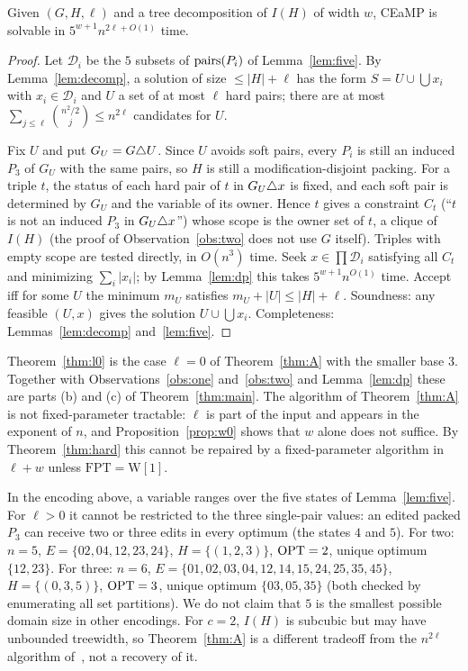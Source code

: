 \begin{theorem}\label{thm:A}
Given $(G,H,\ell)$ and a tree decomposition of $I(H)$ of width $w$, CEaMP is solvable in $5^{w+1}n^{2\ell+O(1)}$ time.
\end{theorem}
\begin{proof}
Let $\mathcal D_i$ be the $5$ subsets of $\mathrm{pairs}(P_i)$ of Lemma~\ref{lem:five}. By Lemma~\ref{lem:decomp}, a solution of size $\le|H|+\ell$ has the form $S=U\cup\bigcup x_i$ with $x_i\in\mathcal D_i$ and $U$ a set of at most $\ell$ hard pairs; there are at most $\sum_{j\le\ell}\binom{n^2/2}{j}\le n^{2\ell}$ candidates for $U$.

Fix $U$ and put $G_U=G\triangle U$. Since $U$ avoids soft pairs, every $P_i$ is still an induced $P_3$ of $G_U$ with the same pairs, so $H$ is still a modification-disjoint packing. For a triple $t$, the status of each hard pair of $t$ in $G_U\triangle x$ is fixed, and each soft pair is determined by $G_U$ and the variable of its owner. Hence $t$ gives a constraint $C_t$ (``$t$ is not an induced $P_3$ in $G_U\triangle x$'') whose scope is the owner set of $t$, a clique of $I(H)$ (the proof of Observation~\ref{obs:two} does not use $G$ itself). Triples with empty scope are tested directly, in $O(n^3)$ time. Seek $x\in\prod\mathcal D_i$ satisfying all $C_t$ and minimizing $\sum_i|x_i|$; by Lemma~\ref{lem:dp} this takes $5^{w+1}n^{O(1)}$ time. Accept iff for some $U$ the minimum $m_U$ satisfies $m_U+|U|\le|H|+\ell$. Soundness: any feasible $(U,x)$ gives the solution $U\cup\bigcup x_i$. Completeness: Lemmas~\ref{lem:decomp} and~\ref{lem:five}.
\end{proof}
Theorem~\ref{thm:l0} is the case $\ell=0$ of Theorem~\ref{thm:A} with the smaller base $3$. Together with Observations~\ref{obs:one} and~\ref{obs:two} and Lemma~\ref{lem:dp} these are parts (b) and (c) of Theorem~\ref{thm:main}. The algorithm of Theorem~\ref{thm:A} is not fixed-parameter tractable: $\ell$ is part of the input and appears in the exponent of $n$, and Proposition~\ref{prop:w0} shows that $w$ alone does not suffice. By Theorem~\ref{thm:hard} this cannot be repaired by a fixed-parameter algorithm in $\ell+w$ unless $\mathrm{FPT}=\mathrm{W[1]}$.

\begin{remark}\label{rem:domain}
In the encoding above, a variable ranges over the five states of Lemma~\ref{lem:five}. For $\ell>0$ it cannot be restricted to the three single-pair values: an edited packed $P_3$ can receive two or three edits in every optimum (the states $4$ and $5$). For two: $n=5$, $E=\{02,04,12,23,24\}$, $H=\{(1,2,3)\}$, $\mathrm{OPT}=2$, unique optimum $\{12,23\}$. For three: $n=6$, $E=\{01,02,03,04,12,14,15,24,25,35,45\}$, $H=\{(0,3,5)\}$, $\mathrm{OPT}=3$, unique optimum $\{03,05,35\}$ (both checked by enumerating all set partitions). We do not claim that $5$ is the smallest possible domain size in other encodings. For $c=2$, $I(H)$ is subcubic but may have unbounded treewidth, so Theorem~\ref{thm:A} is a different tradeoff from the $n^{2\ell}$ algorithm of~\cite{LPS23}, not a recovery of it.
\end{remark}

